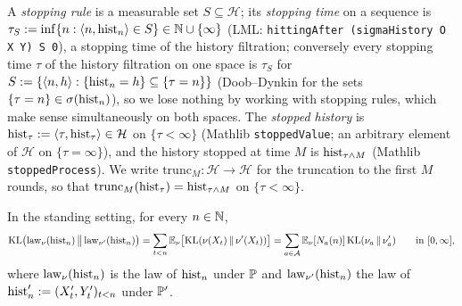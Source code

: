 A \emph{stopping rule} is a measurable set $S \subseteq \mathcal H$; its \emph{stopping time}
on a sequence is $\tau_S := \inf\{n : \langle n, \mathrm{hist}_n\rangle \in S\} \in \mathbb{N} \cup \{\infty\}$
(LML: \texttt{hittingAfter (sigmaHistory O X Y) S 0}), a stopping time of the history
filtration; conversely every stopping time $\tau$ of the history filtration on one space is
$\tau_S$ for $S := \{\langle n, h\rangle : \{\mathrm{hist}_n = h\} \subseteq \{\tau = n\}\}$ (Doob--Dynkin
for the sets $\{\tau = n\} \in \sigma(\mathrm{hist}_n)$), so we lose nothing by working with stopping
rules, which make sense simultaneously on both spaces. The \emph{stopped history} is
$\mathrm{hist}_\tau := \langle \tau, \mathrm{hist}_\tau\rangle \in \mathcal H$ on $\{\tau < \infty\}$ (Mathlib
\texttt{stoppedValue}; an arbitrary element of $\mathcal H$ on $\{\tau = \infty\}$), and the
history stopped at time $M$ is $\mathrm{hist}_{\tau \wedge M}$ (Mathlib \texttt{stoppedProcess}). We
write $\mathrm{trunc}_M : \mathcal H \to \mathcal H$ for the truncation to the first $M$ rounds,
so that $\mathrm{trunc}_M(\mathrm{hist}_\tau) = \mathrm{hist}_{\tau\wedge M}$ on $\{\tau < \infty\}$.

\begin{lemma}\label{lem:kl_history_le}
\leanok
In the standing setting, for every $n \in \mathbb{N}$,
\[
  \mathrm{KL}\big(\mathrm{law}_\nu(\mathrm{hist}_n)\,\big\|\,\mathrm{law}_{\nu'}(\mathrm{hist}_n)\big)
  = \sum_{t < n} \mathbb{E}_\nu\big[\mathrm{KL}(\nu(X_t)\,\|\,\nu'(X_t))\big]
  = \sum_{a \in \mathcal{A}} \mathbb{E}_\nu[N_a(n)]\,\mathrm{KL}(\nu_a \,\|\, \nu'_a) \qquad\text{in } [0, \infty],
\]
where $\mathrm{law}_\nu(\mathrm{hist}_n)$ is the law of $\mathrm{hist}_n$ under $\mathbb{P}$ and
$\mathrm{law}_{\nu'}(\mathrm{hist}_n)$ the law of $\mathrm{hist}'_n := (X'_t, Y'_t)_{t<n}$ under $\mathbb{P}'$.
\end{lemma}

